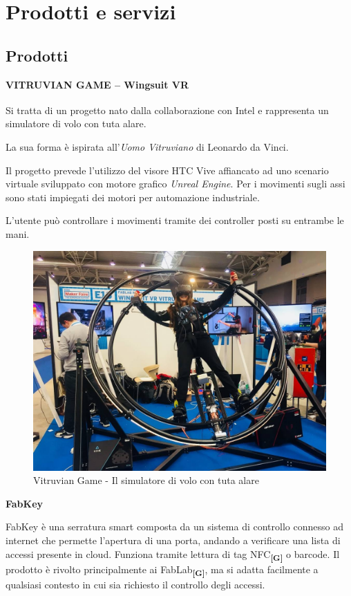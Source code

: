 \section{Prodotti e servizi}
\subsection{Prodotti}
\textbf{VITRUVIAN GAME – Wingsuit VR}

Si tratta di un progetto nato dalla collaborazione con Intel\textsuperscript{\textregistered} e rappresenta un simulatore di volo con tuta alare.

La sua forma è ispirata all'\textit{Uomo Vitruviano} di Leonardo da Vinci.

Il progetto prevede l'utilizzo del visore HTC Vive affiancato ad uno scenario virtuale sviluppato con motore grafico \textit{Unreal Engine}. Per i movimenti sugli assi sono stati impiegati dei motori per automazione industriale.

L'utente può controllare i movimenti tramite dei controller posti su entrambe le mani.

\begin{figure}[H]
	\begin{center}
	\includegraphics[scale=0.15]{immagini/vitruvian.jpg}
	\caption{Vitruvian Game - Il simulatore di volo con tuta alare}
	\end{center}
\end{figure}

\textbf{FabKey}

FabKey è una serratura smart composta da un sistema di controllo connesso ad internet che permette l'apertura di una porta, andando a verificare una lista di accessi presente in cloud. Funziona tramite lettura di tag \gls{NFC}\textbf{\textsubscript{[G]}} o barcode. Il prodotto è rivolto principalmente ai \gls{FabLab}\textbf{\textsubscript{[G]}}, ma si adatta facilmente a qualsiasi contesto in cui sia richiesto il controllo degli accessi.

